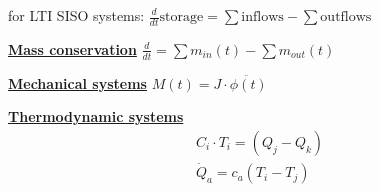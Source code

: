 for LTI SISO systems: $\frac{d}{dt} \text{storage} = \sum \text{inflows} - \sum \text{outflows}$

{\centering \textbf{\underline{Mass conservation}}}
    $\frac{d}{dt} = \sum m_{in}(t) - \sum m_{out}(t)$

{\centering\textbf{\underline{Mechanical systems}}}
    $M(t) = J \cdot \ddot{\phi(t)}$

{\centering\textbf{\underline{Thermodynamic systems}}}
    \begin{align*}
        C_i \cdot T_i = (Q_j - Q_k)\\
        \dot{Q}_a = c_a(T_i - T_j)
    \end{align*}